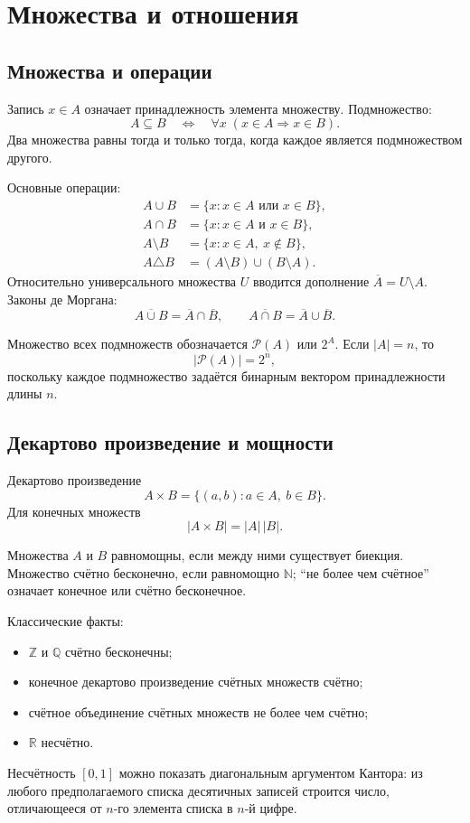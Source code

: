 \section{Множества и отношения}
\label{sec:sets-relations}

\subsection{Множества и операции}

Запись $x\in A$ означает принадлежность элемента множеству. Подмножество:
\[
 A\subseteq B
 \quad\Longleftrightarrow\quad
 \forall x\;(x\in A\Rightarrow x\in B).
\]
Два множества равны тогда и только тогда, когда каждое является подмножеством
другого.

Основные операции:
\[
\begin{aligned}
 A\cup B&=\{x:x\in A\text{ или }x\in B\},\\
 A\cap B&=\{x:x\in A\text{ и }x\in B\},\\
 A\setminus B&=\{x:x\in A,\ x\notin B\},\\
 A\triangle B&=(A\setminus B)\cup(B\setminus A).
\end{aligned}
\]
Относительно универсального множества $U$ вводится дополнение
$\overline A=U\setminus A$. Законы де Моргана:
\[
 \overline{A\cup B}=\overline A\cap\overline B,
 \qquad
 \overline{A\cap B}=\overline A\cup\overline B.
\]

Множество всех подмножеств обозначается $\mathcal P(A)$ или $2^A$. Если
$|A|=n$, то
\[
    |\mathcal P(A)|=2^n,
\]
поскольку каждое подмножество задаётся бинарным вектором принадлежности длины
$n$.

\subsection{Декартово произведение и мощности}

Декартово произведение
\[
    A\times B=\{(a,b):a\in A,\ b\in B\}.
\]
Для конечных множеств
\[
    |A\times B|=|A|\,|B|.
\]

Множества $A$ и $B$ равномощны, если между ними существует биекция. Множество
счётно бесконечно, если равномощно $\mathbb N$; ``не более чем счётное'' означает
конечное или счётно бесконечное.

Классические факты:
\begin{itemize}
 \item $\mathbb Z$ и $\mathbb Q$ счётно бесконечны;
 \item конечное декартово произведение счётных множеств счётно;
 \item счётное объединение счётных множеств не более чем счётно;
 \item $\mathbb R$ несчётно.
\end{itemize}
Несчётность $[0,1]$ можно показать диагональным аргументом Кантора: из любого
предполагаемого списка десятичных записей строится число, отличающееся от
$n$-го элемента списка в $n$-й цифре.

